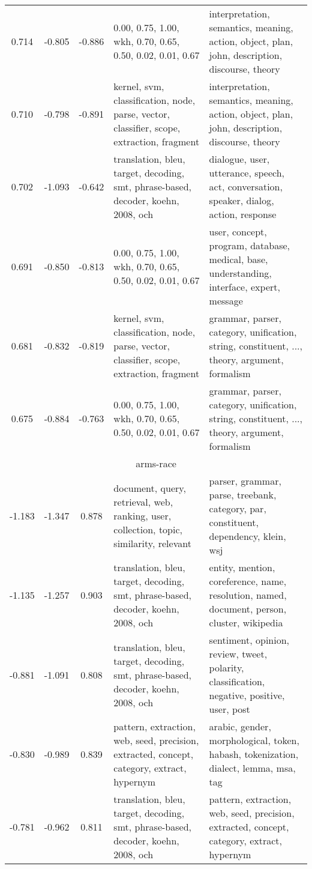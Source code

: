 \begin{tabular}{cccp{5cm}p{5cm}}
0.714 & -0.805 & -0.886 & 0.00, 0.75, 1.00, wkh, 0.70, 0.65, 0.50, 0.02, 0.01, 0.67 & interpretation, semantics, meaning, action, object, plan, john, description, discourse, theory \\
0.710 & -0.798 & -0.891 & kernel, svm, classification, node, parse, vector, classifier, scope, extraction, fragment & interpretation, semantics, meaning, action, object, plan, john, description, discourse, theory \\
0.702 & -1.093 & -0.642 & translation, bleu, target, decoding, smt, phrase-based, decoder, koehn, 2008, och & dialogue, user, utterance, speech, act, conversation, speaker, dialog, action, response \\
0.691 & -0.850 & -0.813 & 0.00, 0.75, 1.00, wkh, 0.70, 0.65, 0.50, 0.02, 0.01, 0.67 & user, concept, program, database, medical, base, understanding, interface, expert, message \\
0.681 & -0.832 & -0.819 & kernel, svm, classification, node, parse, vector, classifier, scope, extraction, fragment & grammar, parser, category, unification, string, constituent, ..., theory, argument, formalism \\
0.675 & -0.884 & -0.763 & 0.00, 0.75, 1.00, wkh, 0.70, 0.65, 0.50, 0.02, 0.01, 0.67 & grammar, parser, category, unification, string, constituent, ..., theory, argument, formalism \\
\midrule
\multicolumn{5}{c}{arms-race}\\
-1.183 & -1.347 & 0.878 & document, query, retrieval, web, ranking, user, collection, topic, similarity, relevant & parser, grammar, parse, treebank, category, par, constituent, dependency, klein, wsj \\
-1.135 & -1.257 & 0.903 & translation, bleu, target, decoding, smt, phrase-based, decoder, koehn, 2008, och & entity, mention, coreference, name, resolution, named, document, person, cluster, wikipedia \\
-0.881 & -1.091 & 0.808 & translation, bleu, target, decoding, smt, phrase-based, decoder, koehn, 2008, och & sentiment, opinion, review, tweet, polarity, classification, negative, positive, user, post \\
-0.830 & -0.989 & 0.839 & pattern, extraction, web, seed, precision, extracted, concept, category, extract, hypernym & arabic, gender, morphological, token, habash, tokenization, dialect, lemma, msa, tag \\
-0.781 & -0.962 & 0.811 & translation, bleu, target, decoding, smt, phrase-based, decoder, koehn, 2008, och & pattern, extraction, web, seed, precision, extracted, concept, category, extract, hypernym \\

\end{tabular}
